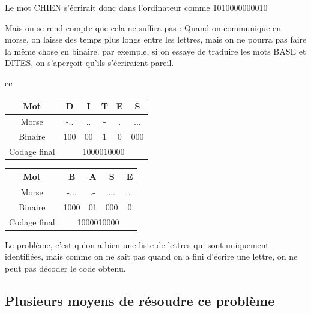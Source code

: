 \documentclass[10pt,a4paper]{book}
\begin{document}
Le mot CHIEN s'écrirait donc dans l'ordinateur comme 1010000000010

Mais on se rend compte que cela ne suffira pas : Quand on communique en morse, on laisse des temps plus longs entre les lettres, mais on ne pourra pas faire la même chose en binaire. par exemple, si on essaye de traduire les mots BASE et DITES, on s'aperçoit qu'ils s'écriraient pareil.



\begin{center}
\begin {tabular}{cc}
    \begin{tabular}{|c|c|c|c|c|c|}
         \hline
         Mot & D & I & T & E & S \\
         \hline
         Morse &-.. & .. & - & . & ...\\
         \hline
         Binaire & 100 & 00 & 1 & 0 & 000\\
         \hline
         Codage final &\multicolumn{5}{c|}{1000010000}\\
         \hline
    \end{tabular}

    \begin{tabular}{|c|c|c|c|c|}
         \hline
         Mot & B & A & S & E \\
         \hline
         Morse & -... & .- & ... & .\\
         \hline
         Binaire & 1000 & 01 & 000 & 0\\
         \hline
         Codage final &\multicolumn{4}{c|}{1000010000}\\
         \hline
    \end{tabular}
\end{tabular}

\end{center}

Le problème, c'est qu'on a bien une liste de lettres qui sont uniquement identifiées, mais comme on ne sait pas quand on a fini d'écrire une lettre, on ne peut pas décoder le code obtenu.

\subsection{Plusieurs moyens de résoudre ce problème}
\end{document}
